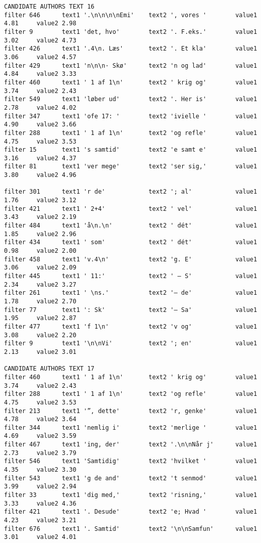 {\begin{verbatim}
CANDIDATE AUTHORS TEXT 16
filter 646      text1 '.\n\n\n\nEmi'    text2 ', vores '        value1 4.81     value2 2.98
filter 9        text1 'det, hvo'        text2 '. F.eks.'        value1 3.02     value2 4.73
filter 426      text1 '.4\n. Læs'       text2 '. Et kla'        value1 3.06     value2 4.57
filter 429      text1 'n\n\n· Skø'      text2 'n og lad'        value1 4.84     value2 3.33
filter 460      text1 ' 1 af 1\n'       text2 ' krig og'        value1 3.74     value2 2.43
filter 549      text1 'løber ud'        text2 '. Her is'        value1 2.78     value2 4.02
filter 347      text1 'ofe 17: '        text2 'ivielle '        value1 4.90     value2 3.66
filter 288      text1 ' 1 af 1\n'       text2 'og refle'        value1 4.75     value2 3.53
filter 15       text1 's samtid'        text2 'e samt e'        value1 3.16     value2 4.37
filter 81       text1 'ver mege'        text2 'ser sig,'        value1 3.80     value2 4.96

filter 301      text1 'r de'            text2 '; al'            value1 1.76     value2 3.12
filter 421      text1 ' 2+4'            text2 ' vel'            value1 3.43     value2 2.19
filter 484      text1 'å\n.\n'          text2 ' dét'            value1 1.85     value2 2.96
filter 434      text1 ' som'            text2 ' dét'            value1 0.98     value2 2.00
filter 458      text1 'v.4\n'           text2 'g. E'            value1 3.06     value2 2.09
filter 445      text1 ' 11:'            text2 ' – S'            value1 2.34     value2 3.27
filter 261      text1 ' \ns.'           text2 '– de'            value1 1.78     value2 2.70
filter 77       text1 ': Sk'            text2 '– Sa'            value1 1.95     value2 2.87
filter 477      text1 'f 1\n'           text2 'v og'            value1 3.08     value2 2.20
filter 9        text1 '\n\nVi'          text2 '; en'            value1 2.13     value2 3.01

CANDIDATE AUTHORS TEXT 17
filter 460      text1 ' 1 af 1\n'       text2 ' krig og'        value1 3.74     value2 2.43
filter 288      text1 ' 1 af 1\n'       text2 'og refle'        value1 4.75     value2 3.53
filter 213      text1 '”, dette'        text2 'r, genke'        value1 4.78     value2 3.64
filter 344      text1 'nemlig i'        text2 'merlige '        value1 4.69     value2 3.59
filter 467      text1 'ing, der'        text2 '.\n\nNår j'      value1 2.73     value2 3.79
filter 546      text1 'Samtidig'        text2 'hvilket '        value1 4.35     value2 3.30
filter 543      text1 'g de and'        text2 't senmod'        value1 3.99     value2 2.94
filter 33       text1 'dig med,'        text2 'risning,'        value1 3.33     value2 4.36
filter 421      text1 '. Desude'        text2 'e; Hvad '        value1 4.23     value2 3.21
filter 676      text1 '. Samtid'        text2 '\n\nSamfun'      value1 3.01     value2 4.01


\end{verbatim}}
